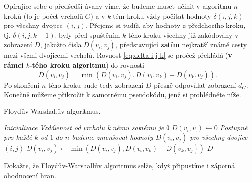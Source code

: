 Opírajíce sebe o předšedší úvahy víme, že budeme muset učinit v algoritmu $n$
kroků (to je počet vrcholů $G$) a v $k$-tém kroku vždy počítat hodnoty
$\delta(i,j,k)$ pro všechny dvojice $(i,j)$. Přejeme si tudíž, aby hodnoty z
předchozího kroku, tj. $\delta(i,j,k-1)$, byly před spuštěním $k$-tého kroku
všechny již zakódovány v zobrazení $D$, jakožto čísla $D(v_i,v_j)$,
představující \textbf{zatím} nejkratší známé cesty mezi všemi dvojicemi vrcholů.
Rovnost \eqref{eq:delta-i-j-k} se pročež překládá (\textbf{v rámci $k$-tého
kroku algoritmu}) do rovnosti
\[
 D(v_i,v_j) = \min(D(v_i,v_j), D(v_i,v_k) + D(v_k, v_j)).
\]
Po skončení $n$-tého kroku bude tedy zobrazení $D$ přesně odpovídat zobrazení
$d_G$. Konečně můžeme přikročit k samotnému pseudokódu, jenž si prohlédněte
\hyperref[alg:floyd-warshall]{níže}.

\begin{algorithm}
 \caption{Floydův-Warshallův algoritmus.}
 \label{alg:floyd-warshall}


 \Output{zobrazení $D:V^2 \to (0,\infty]$ takové, že $D \equiv d_G$}
 \BlankLine
 \emph{Inicializace}\;
  {
   {
    {
    \emph{Vzdálenost od vrcholu k němu samému je $0$}\;
    $D(v_i,v_i) \leftarrow 0$\;
   }
  }
 }
 \BlankLine
 \emph{Postupně pro každé $k$ od $1$ do $n$ budeme zmenšovat hodnoty
 $D(v_i,v_j)$ pro všechny dvojice $(i,j)$}\;
  {
   {
    {
    $D(v_i,v_j) \leftarrow \min(D(v_i,v_j), D(v_i,v_k) + D(v_k,v_j))$\;
   }
  }
 }
 \KwReturn $D$\;
\end{algorithm}

\begin{exercise}
 Dokažte, že \hyperref[alg:floyd-warshall]{Floydův-Warshallův} algoritmus selže,
 když připustíme i záporná ohodnocení hran.
\end{exercise}

